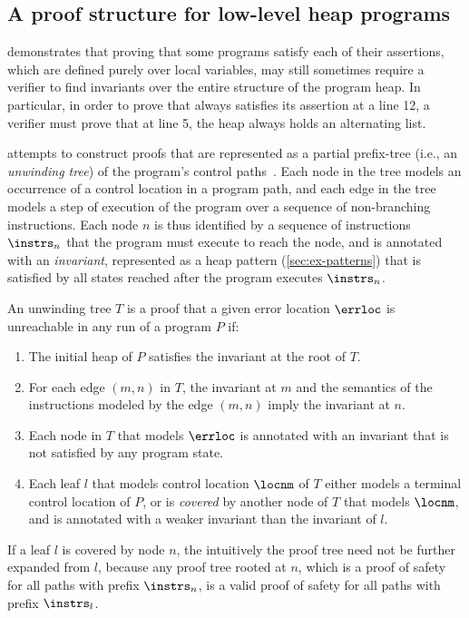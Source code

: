 \subsection{A proof structure for low-level heap programs}
\label{sec:ex-tree}
\altlist demonstrates that proving that some programs satisfy each of
their assertions, which are defined purely over local variables, may
still sometimes require a verifier to find invariants over the entire
structure of the program heap.
%
In particular, in order to prove that \altlist always satisfies its
assertion at a line 12, a verifier must prove that at line 5, the heap
always holds an alternating list.

\verifier attempts to construct proofs that are represented as a
partial prefix-tree (i.e., an \emph{unwinding tree}) of the program's
control paths~\cite{mcmillan06}.
Each node in the tree models an occurrence of a control location in a
program path, and each edge in the tree models a step of execution of
the program over a sequence of non-branching instructions.
Each node $n$ is thus identified by a sequence of instructions
$\instrs_n$ that the program must execute to reach the node, and is
annotated with an \emph{invariant}, represented as a heap pattern
(\autoref{sec:ex-patterns}) that is satisfied by all states reached
after the program executes $\instrs_n$.

An unwinding tree $T$ is a proof that a given error location $\errloc$
is unreachable in any run of a program $P$ if:
%
\begin{enumerate}
%
\item 
  The initial heap of $P$ satisfies the invariant at the root of $T$.
\item
  For each edge $(m, n)$ in $T$, the invariant at $m$ and the
  semantics of the instructions modeled by the edge $(m, n)$ imply the
  invariant at $n$.
\item
  Each node in $T$ that models $\errloc$ is annotated with an
  invariant that is not satisfied by any program state.
\item
  Each leaf $l$ that models control location $\locnm$ of $T$ either
  models a terminal control location of $P$, or is \emph{covered} by
  another node of $T$ that models $\locnm$, and is annotated with a
  weaker invariant than the invariant of $l$.
\end{enumerate}
%
If a leaf $l$ is covered by node $n$, the intuitively the proof tree
need not be further expanded from $l$, because any proof tree rooted
at $n$, which is a proof of safety for all paths with prefix
$\instrs_n$, is a valid proof of safety for all paths with prefix
$\instrs_l$.

